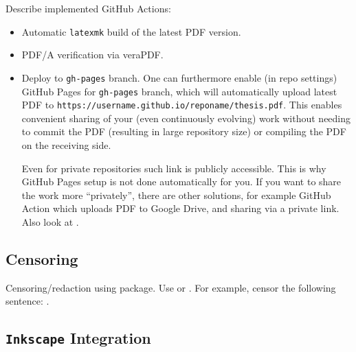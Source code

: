 Describe implemented \textsf{GitHub Actions}:
\begin{itemize}
    \item Automatic \texttt{latexmk} build of the latest PDF version.
    \item PDF/A verification via \textsf{veraPDF}.
    \item Deploy to \texttt{gh-pages} branch.
          One can furthermore enable (in repo settings) \textsf{GitHub Pages} for \texttt{gh-pages} branch, which will automatically upload latest PDF to \texttt{https://username.github.io/reponame/thesis.pdf}.
          This enables convenient sharing of your (even continuously evolving) work without needing to commit the PDF (resulting in large repository size) or compiling the PDF on the receiving side.
          \begin{remark}
              Even for private repositories such link is publicly accessible.
              This is why \textsf{GitHub Pages} setup is not done automatically for you.
              If you want to share the work more \enquote{privately}, there are other solutions, for example \textsf{GitHub Action} which uploads PDF to \textsf{Google Drive}, and sharing via a private link.
              Also look at .
          \end{remark}
\end{itemize}

\subsection{Censoring}%
\label{sub:Censoring}

Censoring/redaction using  package.
Use \macro{\censor} or \macro{\censorbox}.
For example, censor the following sentence: .

\subsection{\texorpdfstring{\texttt{Inkscape}}{Inkscape} Integration}%
\label{sub:Inkscape Integration}

